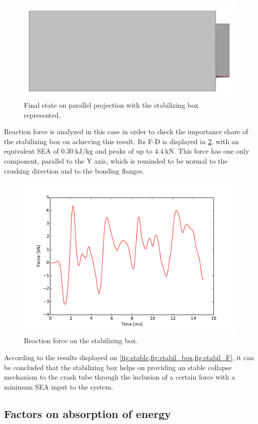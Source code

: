 \documentclass[
documentsize = a4, %
font = cmr, %
typesize = 11, %
printmode = true,
onehalfspacing = true,
language = en, %
titlepage = udciccp, %
degree = pt, %
dedication = true,
acknowledgements = true,
abstract-en = true,
abstract-es = false,
abstract-ga = false,
epigraphs = true,
toc = true,
lof = true,
lot = true,
frontmatterintoc = false,
notation = false,
minimal = false,
]{UDCthesis}
\begin{document}
\begin{figure}
	\centering
	\includegraphics[width=.7\linewidth]{IMG_CUTRES/parallel_stable}
	\caption{Final state on parallel projection with the stabilizing box represented.}
	\label{fig:stabil_box}
\end{figure}

Reaction force is analyzed in this case in order to check the importance share of the stabilizing box on achieving this result. Its \acrlong{F-D} is displayed in \cref{fig:stabil_F}, with an equivalent \gls{SEA} of $\SI{0.30}{\kJ/\kg}$ and peaks of up to $\SI{4.4}{\kN}$. This force has one only component, parallel to the Y axis, which is reminded to be normal to the crushing direction and to the bonding flanges.

\begin{figure}
	\centering
	\includegraphics[width=.7\linewidth]{IMG_CUTRES/RF2_stable}
	\caption{Reaction force on the stabilizing box.}
	\label{fig:stabil_F}
\end{figure}

According to the results displayed on \cref{fig:stable,fig:stabil_box,fig:stabil_F}, it can be concluded that the stabilizing box helps on providing an stable collapse mechanism to the crash tube through the inclusion of a certain force with a minimum \gls{SEA} input to the system.

\subsection{Factors on absorption of energy}
\label{sec:Ea_factors}
\end{document}
